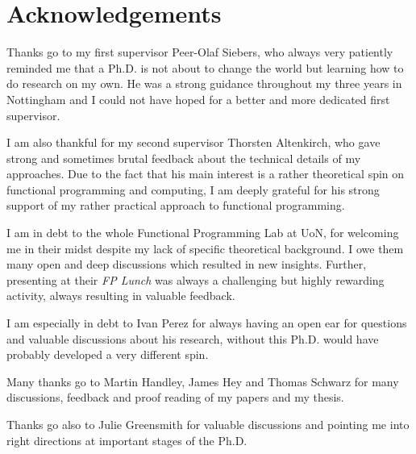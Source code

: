 \chapter*{Acknowledgements}
Thanks go to my first supervisor Peer-Olaf Siebers, who always very patiently reminded me that a Ph.D. is not about to change the world but learning how to do research on my own. He was a strong guidance throughout my three years in Nottingham and I could not have hoped for a better and more dedicated first supervisor.

I am also thankful for my second supervisor Thorsten Altenkirch, who gave strong and sometimes brutal feedback about the technical details of my approaches. Due to the fact that his main interest is a rather theoretical spin on functional programming and computing, I am deeply grateful for his strong support of my rather practical approach to functional programming.

I am in debt to the whole Functional Programming Lab at UoN, for welcoming me in their midst despite my lack of specific theoretical background. I owe them many open and deep discussions which resulted in new insights. Further, presenting at their \textit{FP Lunch} was always a challenging but highly rewarding activity, always resulting in valuable feedback.

I am especially in debt to Ivan Perez for always having an open ear for questions and valuable discussions about his research, without this Ph.D. would have probably developed a very different spin.

Many thanks go to Martin Handley, James Hey and Thomas Schwarz for many discussions, feedback and proof reading of my papers and my thesis.

Thanks go also to Julie Greensmith for valuable discussions and pointing me into right directions at important stages of the Ph.D.